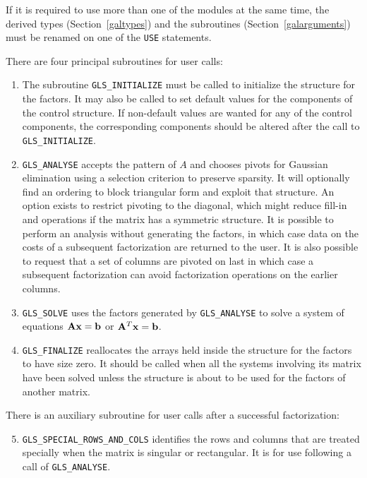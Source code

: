 \documentclass{galahad}
\newcommand{\packagename}{GLS}
\begin{document}
\noindent
If it is required to use more than one of the modules at the same time, 
the derived types
(Section~\ref{galtypes})
and the subroutines
(Section~\ref{galarguments})
must be renamed on one of the {\tt USE} statements.

There are four principal subroutines for user calls:

\begin{enumerate}

\item The subroutine {\tt \packagename\_INITIALIZE} must be 
called to initialize the
structure for the factors. It may also be called to set default values
for the components of the control structure. If non-default values are
wanted for any of the control components, the corresponding components
should be altered after the call to {\tt \packagename\_INITIALIZE}.
 
\item {\tt \packagename\_ANALYSE} accepts the pattern of $A$ and chooses
pivots for Gaussian elimination using a selection criterion to preserve
sparsity.  It will optionally find an ordering to block triangular form
and exploit that structure. An option exists to restrict pivoting to the
diagonal, which might reduce fill-in and operations if the matrix has a
symmetric structure. It is possible to perform an analysis without
generating the factors, in which case data on the costs of a subsequent
factorization are returned to the user.  It is also possible to request
that a set of columns are pivoted on last in which case a subsequent
factorization can avoid factorization operations on the earlier columns.

\item {\tt \packagename\_SOLVE} uses the factors generated by 
{\tt \packagename\_ANALYSE} to
solve a system of equations ${\mathbf{A}} {\mathbf{x}} = {\mathbf{b}}$ or ${\mathbf{A}}^T {\mathbf{x}} = {\mathbf{b}}$.

\item {\tt \packagename\_FINALIZE} reallocates the arrays held inside
the structure for the factors to have size zero. It should be called
when all the systems involving its matrix have been solved unless the
structure is about to be used for the factors of another matrix.

\end{enumerate}

\noindent There is an auxiliary subroutine for user calls after a 
successful factorization:

\begin{enumerate}
\setcounter{enumi}{4}

\item {\tt \packagename\_SPECIAL\_ROWS\_AND\_COLS} identifies the rows
and columns that are treated specially when the matrix is singular or
rectangular.  It is for use following a call of {\tt \packagename\_ANALYSE}.

\end{enumerate}
\end{document}
